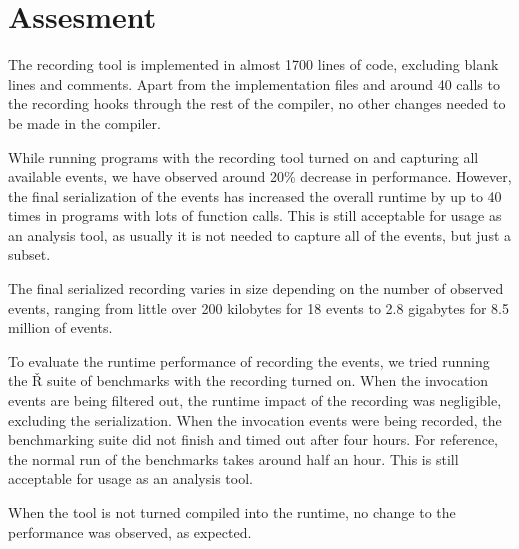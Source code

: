 \section{Assesment}

The recording tool is implemented in almost 1700 lines of code, excluding blank lines and comments. Apart from the implementation files and around 40 calls to the recording hooks through the rest of the compiler, no other changes needed to be made in the compiler.

While running programs with the recording tool turned on and capturing all available events, we have observed around 20\% decrease in performance. However, the final serialization of the events has increased the overall runtime by up to 40 times in programs with lots of function calls. This is still acceptable for usage as an analysis tool, as usually it is not needed to capture all of the events, but just a subset.

The final serialized recording varies in size depending on the number of observed events, ranging from little over 200 kilobytes for 18 events to 2.8 gigabytes for 8.5 million of events.

To evaluate the runtime performance of recording the events, we tried running the Ř suite of benchmarks with the recording turned on. When the invocation events are being filtered out, the runtime impact of the recording was negligible, excluding the serialization. When the invocation events were being recorded, the benchmarking suite did not finish and timed out after four hours. For reference, the normal run of the benchmarks takes around half an hour. This is still acceptable for usage as an analysis tool.

When the tool is not turned compiled into the runtime, no change to the performance was observed, as expected.

